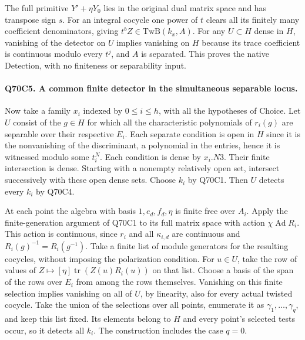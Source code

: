 The full primitive $Y'+\eta Y_0$ lies in the original dual
matrix space and has transpose sign $s$. For an integral cocycle
one power of $t$ clears all its finitely many coefficient
denominators, giving $t^b Z\in\mathrm{TwB}(k_x,A)$.
For any $U\subset H$ dense in $H$, vanishing of the detector on
$U$ implies vanishing on $H$ because its trace coefficient is continuous
modulo every $t^j$, and $A$ is separated. This proves the native
$\mathrm{Detection}$, with no finiteness or separability input.

\paragraph{Q70C5. A common finite detector in the simultaneous separable locus.}
Now take a family $x_i$ indexed by $0\le i\le h$, with all the
hypotheses of Choice. Let $U$ consist of the $g\in H$ for which
all the characteristic polynomials of $r_i(g)$ are separable over
their respective $E_i$. Each separate condition is open in $H$ since it is the nonvanishing of the discriminant, a polynomial in
the entries, hence it is witnessed modulo some $t_i^N$.
Each condition is dense by $x_i.N3$. Their finite intersection
is dense. Starting with a nonempty relatively open set, intersect
successively with these open dense sets. Choose $k_i$ by Q70C1.
Then $U$ detects every $k_i$ by Q70C4.

At each point the algebra with basis $1,e_d,f_d,\eta$ is finite
free over $A_i$. Apply the finite-generation argument of Q70C1 to
its full matrix space with action $\chi\operatorname{Ad}R_i$.
This action is continuous, since $r_i$ and all $\kappa_{i,d}$
are continuous and $R_i(g)^{-1}=R_i(g^{-1})$.
Take a finite list of module generators for the resulting
cocycles, without imposing the polarization condition. For
$u\in U$, take the row of values of
$Z\mapsto[\eta]\operatorname{tr}(Z(u)R_i(u))$ on that list.
Choose a basis of the span of the rows over $E_i$ from among
the rows themselves. Vanishing on this finite selection implies
vanishing on all of $U$, by linearity, also for every actual
twisted cocycle. Take the union of the selections over all
points, enumerate it as $\gamma_1,\ldots,\gamma_q$, and keep
this list fixed. Its elements belong to $H$ and every point's
selected tests occur, so it detects all $k_i$. The construction
includes the case $q=0$.

